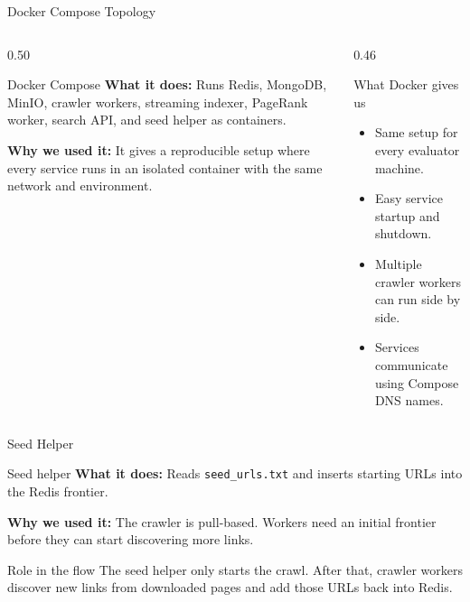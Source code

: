 \documentclass[aspectratio=169,11pt]{beamer}
\newcommand{\component}[3]{%
  \begin{block}{#1}
    \textbf{What it does:} #2

    \vspace{0.35em}
    \textbf{Why we used it:} #3
  \end{block}
}
\begin{document}
\begin{frame}{Docker Compose Topology}
  \begin{columns}[T,totalwidth=\textwidth]
    \begin{column}{0.50\textwidth}
      \component{Docker Compose}
      {Runs Redis, MongoDB, MinIO, crawler workers, streaming indexer, PageRank worker, search API, and seed helper as containers.}
      {It gives a reproducible setup where every service runs in an isolated container with the same network and environment.}
    \end{column}
    \begin{column}{0.46\textwidth}
      \begin{block}{What Docker gives us}
        \begin{itemize}
          \item Same setup for every evaluator machine.
          \item Easy service startup and shutdown.
          \item Multiple crawler workers can run side by side.
          \item Services communicate using Compose DNS names.
        \end{itemize}
      \end{block}
    \end{column}
  \end{columns}
\end{frame}

\begin{frame}{Seed Helper}
  \component{Seed helper}
  {Reads \texttt{seed\_urls.txt} and inserts starting URLs into the Redis frontier.}
  {The crawler is pull-based. Workers need an initial frontier before they can start discovering more links.}

  \begin{block}{Role in the flow}
    The seed helper only starts the crawl. After that, crawler workers discover new links from downloaded pages and add those URLs back into Redis.
  \end{block}
\end{frame}
\end{document}
